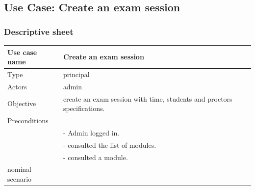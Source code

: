 \documentclass[]{uc2pfecaneva}
\begin{document}
    \begin{table}[t]
        \raggedright\subsection{Use Case: Create an exam session}
        \subsubsection{Descriptive sheet}
        \centering
        \begin{tabularx}{\textwidth}{|l|X|}
            \hline
            Use case name         & Create an exam session                                                                                                                                            \\ \hline
            Type                  & principal                                                                                                                                                         \\ \hline
            Actors                & admin                                                                                                                                                             \\ \hline
            Objective             & create an exam session with time, students and proctors specifications.                                                                                           \\ \hline
            Preconditions         &                                                                                                                                                                   \\
            & - Admin logged in.                                                                                                                                                \\
            & - consulted the list of modules.                                                                                                                                  \\
            & - consulted a module.                                                                                                                                             \\ \hline
            nominal scenario      &                                                                                                                                                                   \\

\end{tabularx}
\end{table}
\end{document}
